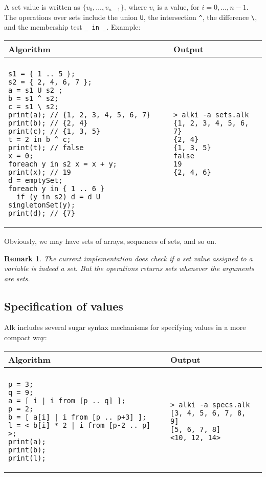 \documentclass[a4paper]{report}
\newtheorem*{remark}{Remark}
\begin{document}
A set value is written as $\{ v_0,\ldots,v_{n-1}\}$, where $v_i$ is a value, for $i=0,\ldots,n-1$. The operations over sets include the union \verb|U|, the intersection \verb|^|, the difference \verb|\|, and the membership test \verb|_ in _|.
Example:
\begin{center}
\begin{tabular}{ll}
Algorithm & Output\\
\hline
\\
\begin{minipage}{.55\textwidth}
\begin{verbatim}
s1 = { 1 .. 5 };
s2 = { 2, 4, 6, 7 };
a = s1 U s2 ;
b = s1 ^ s2;
c = s1 \ s2;
print(a); // {1, 2, 3, 4, 5, 6, 7}
print(b); // {2, 4}
print(c); // {1, 3, 5}
t = 2 in b ^ c;
print(t); // false
x = 0;
foreach y in s2 x = x + y;
print(x); // 19
d = emptySet;
foreach y in { 1 .. 6 }
  if (y in s2) d = d U singletonSet(y);
print(d); // {7}
\end{verbatim}
\end{minipage}
&
\begin{minipage}{.45\textwidth}
\begin{verbatim}
> alki -a sets.alk 
{1, 2, 3, 4, 5, 6, 7}
{2, 4}
{1, 3, 5}
false
19
{2, 4, 6}
\end{verbatim}
\end{minipage}
\end{tabular}
\end{center}

Obviously, we may have sets of arrays, sequences of sets, and so on.

\begin{remark}
The current implementation does check if a set value assigned to a variable is indeed a set. But the operations returns sets whenever the arguments are sets.
\end{remark}

\subsection{Specification of values}

Alk includes several sugar syntax mechanisms for specifying values in a more compact way:
\begin{center}
\begin{tabular}{ll}
Algorithm & Output\\
\hline
\\
\begin{minipage}{.45\textwidth}
\begin{verbatim}
p = 3;
q = 9;
a = [ i | i from [p .. q] ];
p = 2;
b = [ a[i] | i from [p .. p+3] ];
l = < b[i] * 2 | i from [p-2 .. p] >;
print(a);
print(b);
print(l);
\end{verbatim}
\end{minipage}
&
\begin{minipage}{.45\textwidth}
\begin{verbatim}
> alki -a specs.alk
[3, 4, 5, 6, 7, 8, 9]
[5, 6, 7, 8]
<10, 12, 14>
\end{verbatim}
\end{minipage}
\end{tabular}
\end{center}
\end{document}
